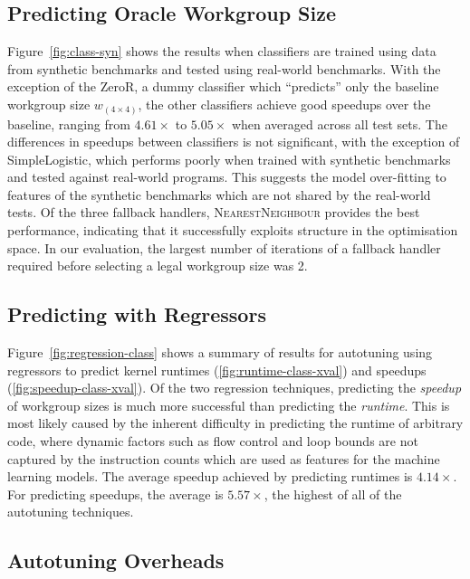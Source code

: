 \documentclass{acaces}
\begin{document}
\subsection{Predicting Oracle Workgroup Size}

Figure~\ref{fig:class-syn} shows the results when classifiers are
trained using data from synthetic benchmarks and tested using
real-world benchmarks. With the exception of the ZeroR, a dummy
classifier which ``predicts'' only the baseline workgroup size
$w_{\left( 4 \times 4 \right)}$, the other classifiers achieve good
speedups over the baseline, ranging from $4.61\times$ to $5.05\times$
when averaged across all test sets. The differences in speedups
between classifiers is not significant, with the exception of
SimpleLogistic, which performs poorly when trained with synthetic
benchmarks and tested against real-world programs. This suggests the
model over-fitting to features of the synthetic benchmarks which are
not shared by the real-world tests. Of the three fallback handlers,
\textsc{NearestNeighbour} provides the best performance, indicating
that it successfully exploits structure in the optimisation space. In
our evaluation, the largest number of iterations of a fallback handler
required before selecting a legal workgroup size was 2.


\subsection{Predicting with Regressors}

Figure~\ref{fig:regression-class} shows a summary of results for
autotuning using regressors to predict kernel runtimes
(\ref{fig:runtime-class-xval}) and speedups
(\ref{fig:speedup-class-xval}). Of the two regression techniques,
predicting the \emph{speedup} of workgroup sizes is much more
successful than predicting the \emph{runtime}. This is most likely
caused by the inherent difficulty in predicting the runtime of
arbitrary code, where dynamic factors such as flow control and loop
bounds are not captured by the instruction counts which are used as
features for the machine learning models. The average speedup achieved
by predicting runtimes is $4.14\times$. For predicting speedups, the
average is $5.57\times$, the highest of all of the autotuning
techniques.

\subsection{Autotuning Overheads}
\end{document}

